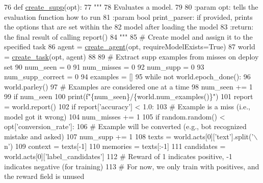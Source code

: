 \begin{DoxyCode}
76 \textcolor{keyword}{def }\hyperlink{namespaceprojects_1_1self__feeding_1_1scripts_1_1create__synth__supp_a81cbb13896d9614507b68362e90d8f6c}{create\_supp}(opt):
77     \textcolor{stringliteral}{"""}
78 \textcolor{stringliteral}{    Evaluates a model.}
79 \textcolor{stringliteral}{}
80 \textcolor{stringliteral}{    :param opt: tells the evaluation function how to run}
81 \textcolor{stringliteral}{    :param bool print\_parser: if provided, prints the options that are set within the}
82 \textcolor{stringliteral}{        model after loading the model}
83 \textcolor{stringliteral}{    :return: the final result of calling report()}
84 \textcolor{stringliteral}{    """}
85     \textcolor{comment}{# Create model and assign it to the specified task}
86     agent = \hyperlink{namespaceparlai_1_1core_1_1agents_a00d77a7e26fb89e8bd900f7b2a02982a}{create\_agent}(opt, requireModelExists=\textcolor{keyword}{True})
87     world = \hyperlink{namespaceparlai_1_1core_1_1worlds_a79969c7ba76d4b3c500f5bb776444dc6}{create\_task}(opt, agent)
88 
89     \textcolor{comment}{# Extract supp examples from misses on deploy set}
90     num\_seen = 0
91     num\_misses = 0
92     num\_supp = 0
93     num\_supp\_correct = 0
94     examples = []
95     \textcolor{keywordflow}{while} \textcolor{keywordflow}{not} world.epoch\_done():
96         world.parley()
97         \textcolor{comment}{# Examples are considered one at a time}
98         num\_seen += 1
99         \textcolor{keywordflow}{if} num\_seen %
100             print(f\textcolor{stringliteral}{"\{num\_seen\}/\{world.num\_examples()\}"})
101         report = world.report()
102         \textcolor{keywordflow}{if} report[\textcolor{stringliteral}{'accuracy'}] < 1.0:
103             \textcolor{comment}{# Example is a miss (i.e., model got it wrong)}
104             num\_misses += 1
105             \textcolor{keywordflow}{if} random.random() < opt[\textcolor{stringliteral}{'conversion\_rate'}]:
106                 \textcolor{comment}{# Example will be converted (e.g., bot recognized mistake and asked)}
107                 num\_supp += 1
108                 texts = world.acts[0][\textcolor{stringliteral}{'text'}].split(\textcolor{stringliteral}{'\(\backslash\)n'})
109                 context = texts[-1]
110                 memories = texts[:-1]
111                 candidates = world.acts[0][\textcolor{stringliteral}{'label\_candidates'}]
112                 \textcolor{comment}{# Reward of 1 indicates positive, -1 indicates negative (for training)}
113                 \textcolor{comment}{# For now, we only train with positives, and the reward field is unused}

\end{DoxyCode}
